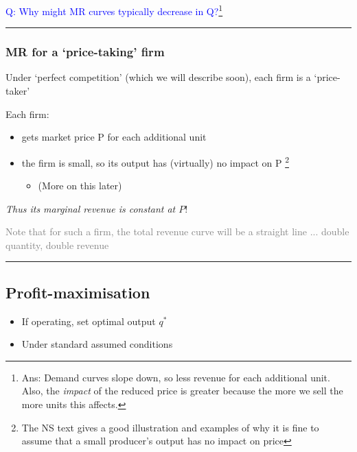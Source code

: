 \documentclass[]{article}
\providecommand{\tightlist}{%
  \setlength{\itemsep}{0pt}\setlength{\parskip}{0pt}}
\begin{document}
\textcolor{blue}{Q: Why might MR curves typically decrease in Q?}\footnote{Ans:
  Demand curves slope down, so less revenue for each additional unit.\\
  Also, the \emph{impact} of the reduced price is greater because the
  more we sell the more units this affects.}

\begin{center}\rule{0.5\linewidth}{\linethickness}\end{center}

\hypertarget{mr-for-a-price-taking-firm}{%
\subsubsection{MR for a `price-taking'
firm}\label{mr-for-a-price-taking-firm}}

Under `perfect competition' (which we will describe soon), each firm is
a `price-taker'

Each firm:

\begin{itemize}
\tightlist
\item
  gets market price P for each additional unit
\item
  the firm is small, so its output has (virtually) no impact on P
  \footnote{The NS text gives a good illustration and examples of why it
    is fine to assume that a small producer's output has no impact on
    price}

  \begin{itemize}
  \tightlist
  \item
    (More on this later)
  \end{itemize}
\end{itemize}

\bigskip

\emph{Thus its marginal revenue is constant at \(P\)}!

\textcolor{gray}{Note that for such a firm, the total revenue curve will be a straight line ... double quantity, double revenue}

\begin{center}\rule{0.5\linewidth}{\linethickness}\end{center}

\hypertarget{profit-maximisation}{%
\subsection{Profit-maximisation}\label{profit-maximisation}}

\begin{itemize}
\tightlist
\item
  If operating, set optimal output \(q^*\)
\item
  Under standard assumed conditions
\end{itemize}
\end{document}
